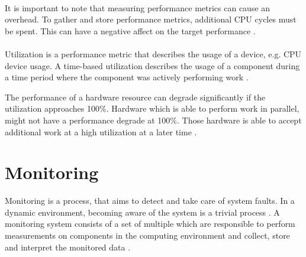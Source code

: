\paragraph{}It is important to note that measuring performance metrics can cause an overhead. To gather and store performance metrics, additional CPU cycles must be spent. This can have a negative affect on the target performance \cite{Greg2020SysPerf}.


\paragraph{}
Utilization is a performance metric that describes the usage of a device, e.g. CPU device usage.
A time-based utilization describes the usage of a component during a time period where the component was actively performing work \cite{Greg2020SysPerf}.


The performance of a hardware resource can degrade significantly if the utilization approaches 100\%.
Hardware which is able to perform work in parallel, might not have a performance degrade at 100\%. Those hardware is able to accept additional work at a high utilization at a later time \cite{Greg2020SysPerf}.


\section{Monitoring}
\label{sec:02_monitoring}
Monitoring is a process, that aims to detect and take care of system faults. In a dynamic environment, becoming aware of the system is a trivial process \cite{Ligus2012EffMonitoring}.
A monitoring system consists of a set of multiple which are responsible to perform measurements on components in the computing environment and collect, store and interpret the monitored data \cite{Ligus2012EffMonitoring}. 


